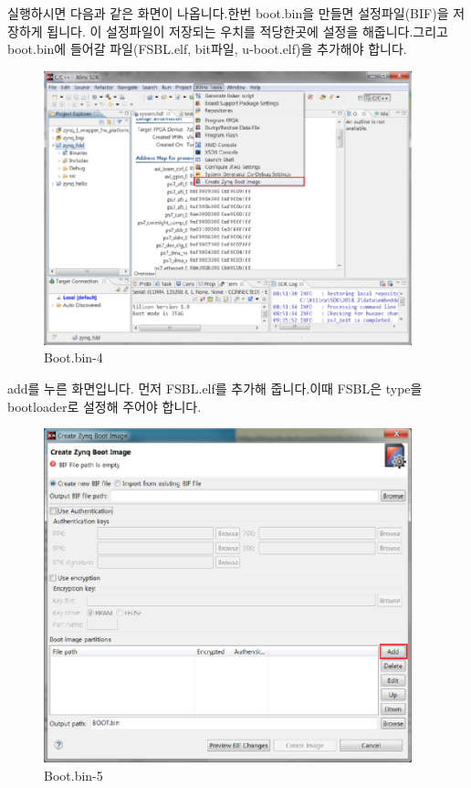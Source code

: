 \documentclass[11pt
  , a4paper
  , article
  , oneside
]{memoir}
\begin{document}
실행하시면 다음과 같은 화면이 나옵니다.한번 boot.bin을 만들면 설정파일(BIF)을 저장하게 됩니다. 이 설정파일이 저장되는 우치를 적당한곳에 설정을 해줍니다.그리고 boot.bin에 들어갈 파일(FSBL.elf, bit파일, u-boot.elf)을 추가해야 합니다.

\begin{figure}[h!]
	\centering
	\includegraphics[width=0.95\textwidth]{./images/boot_bin_5.eps}
	\caption{Boot.bin-4}
	\label{fig:boot.bin.4} 
\end{figure}

add를 누른 화면입니다. 먼저 FSBL.elf를 추가해 줍니다.이때 FSBL은 type을 bootloader로 설정해 주어야 합니다.

\begin{figure}[h!]
	\centering
	\includegraphics[width=0.95\textwidth]{./images/boot_bin_6.eps}
	\caption{Boot.bin-5}
	\label{fig:boot.bin.5} 
\end{figure}
\end{document}
